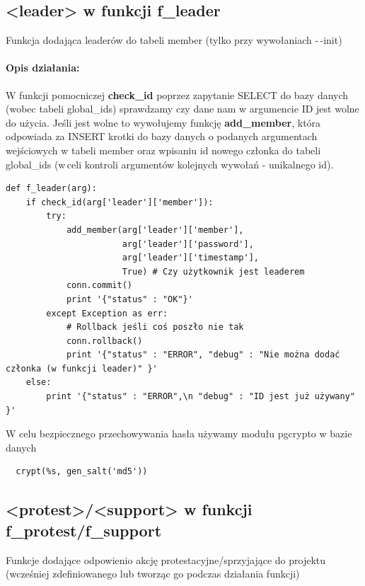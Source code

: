 \documentclass{article}
\begin{document}
\newpage
\subsection{<leader> w funkcji f\_leader}
Funkcja dodająca leaderów do tabeli member (tylko przy wywołaniach -\,-init)
\paragraph{Opis działania: }
W funkcji pomocniczej \textbf{check\_id} poprzez zapytanie SELECT do bazy danych (wobec tabeli global\_ids) sprawdzamy czy dane nam w argumencie ID jest wolne do użycia.
Jeśli jest wolne to wywołujemy funkcję \textbf{add\_member}, która odpowiada za INSERT krotki do bazy danych o podanych argumentach wejściowych w tabeli member oraz wpisaniu id nowego członka do tabeli global\_ids 
(w\,celi kontroli argumentów kolejnych wywołań - unikalnego id).
\begin{verbatim}
def f_leader(arg):
    if check_id(arg['leader']['member']): 
        try:
            add_member(arg['leader']['member'],
                       arg['leader']['password'],
                       arg['leader']['timestamp'], 
                       True) # Czy użytkownik jest leaderem
            conn.commit()
            print '{"status" : "OK"}'
        except Exception as err:
            # Rollback jeśli coś poszło nie tak
            conn.rollback()
            print '{"status" : "ERROR", "debug" : "Nie można dodać członka (w funkcji leader)" }' 
    else: 
        print '{"status" : "ERROR",\n "debug" : "ID jest już używany" }'   
\end{verbatim}

W celu bezpiecznego przechowywania hasła używamy modułu pgcrypto w bazie danych
\begin{verbatim}
  crypt(%s, gen_salt('md5'))
\end{verbatim}







\newpage
\subsection{<protest>/<support> w funkcji f\_protest/f\_support}
Funkcje dodające odpowienio akcję protestacyjne/sprzyjające do projektu (wcześniej zdefiniowanego lub tworząc go podczas działania funkcji)
\end{document}
